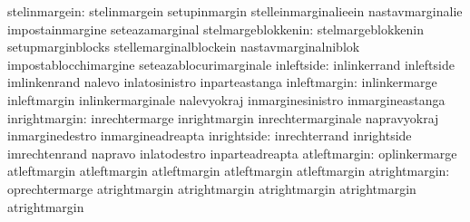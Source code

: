                    stelinmargein: stelinmargein                    setupinmargin
                                  stelleinmarginalieein            nastavmarginalie
                                  impostainmargine                 seteazamarginal
              stelmargeblokkenin: stelmargeblokkenin               setupmarginblocks
                                  stellemarginalblockein           nastavmarginalniblok
                                  impostablocchimargine            seteazablocurimarginale
                      inleftside: inlinkerrand                     inleftside
                                  imlinkenrand                     nalevo
                                  inlatosinistro                   inparteastanga
                    inleftmargin: inlinkermarge                    inleftmargin
                                  inlinkermarginale                nalevyokraj
                                  inmarginesinistro                inmargineastanga
                   inrightmargin: inrechtermarge                   inrightmargin
                                  inrechtermarginale               napravyokraj
                                  inmarginedestro                  inmargineadreapta
                     inrightside: inrechterrand                    inrightside
                                  imrechtenrand                    napravo
                                  inlatodestro                     inparteadreapta
 atleftmargin: oplinkermarge                    atleftmargin
               atleftmargin                     atleftmargin
               atleftmargin                     atleftmargin
atrightmargin: oprechtermarge                   atrightmargin
               atrightmargin                    atrightmargin
               atrightmargin                    atrightmargin

